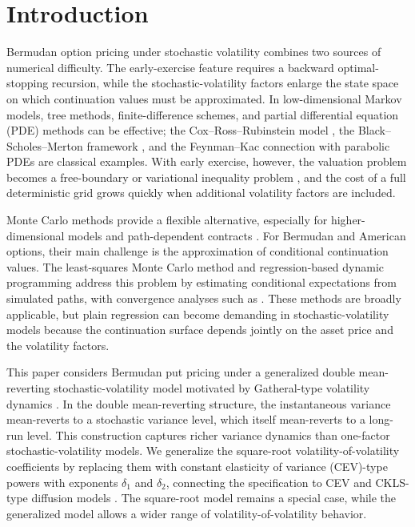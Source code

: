 \documentclass[10pt]{article}
\theoremstyle{plain}
\theoremstyle{definition}
\theoremstyle{remark}
\begin{document}
\section{Introduction}

Bermudan option pricing under stochastic volatility combines two sources of numerical difficulty. The early-exercise feature requires a backward optimal-stopping recursion, while the stochastic-volatility factors enlarge the state space on which continuation values must be approximated. In low-dimensional Markov models, tree methods, finite-difference schemes, and partial differential equation (PDE) methods can be effective; the Cox--Ross--Rubinstein model \citep{cox1979option}, the Black--Scholes--Merton framework \citep{black1973pricing,merton1973theory}, and the Feynman--Kac connection with parabolic PDEs \citep{karatzas1991brownian} are classical examples. With early exercise, however, the valuation problem becomes a free-boundary or variational inequality problem \citep{merton1977americanput,jaillet1990variational}, and the cost of a full deterministic grid grows quickly when additional volatility factors are included.

Monte Carlo methods provide a flexible alternative, especially for higher-dimensional models and path-dependent contracts \citep{glasserman2004montecarlo}. For Bermudan and American options, their main challenge is the approximation of conditional continuation values. The least-squares Monte Carlo method \cite{longstaff2001valuing} and regression-based dynamic programming \cite{tsitsiklis2001regression} address this problem by estimating conditional expectations from simulated paths, with convergence analyses such as \cite{clement2002analysis}. These methods are broadly applicable, but plain regression can become demanding in stochastic-volatility models because the continuation surface depends jointly on the asset price and the volatility factors.

This paper considers Bermudan put pricing under a generalized double mean-reverting stochastic-volatility model motivated by Gatheral-type volatility dynamics \citep{gatheral2006volsurface,bayer2013fast}. In the double mean-reverting structure, the instantaneous variance mean-reverts to a stochastic variance level, which itself mean-reverts to a long-run level. This construction captures richer variance dynamics than one-factor stochastic-volatility models. We generalize the square-root volatility-of-volatility coefficients by replacing them with constant elasticity of variance (CEV)-type powers with exponents $\delta_1$ and $\delta_2$, connecting the specification to CEV and CKLS-type diffusion models \citep{cox1975cev,chan1992empirical}. The square-root model remains a special case, while the generalized model allows a wider range of volatility-of-volatility behavior.
\end{document}
